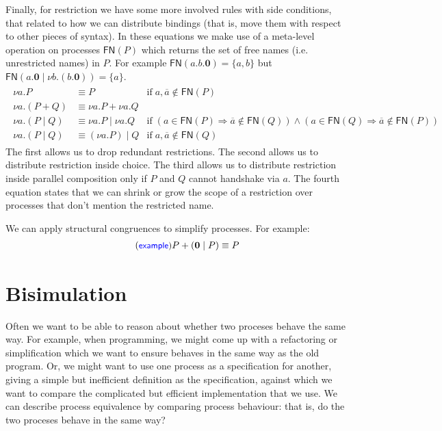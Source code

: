 \documentclass{article}
\newcommand{\exampleLabel}{\tag{\small{\textcolor{blue}{\textsf{example}}}}}
\theoremstyle{definition}
\begin{document}
Finally, for restriction we have some more involved rules
with side conditions, that related to how we can distribute
bindings (that is, move them with respect to other pieces
of syntax). In these equations we make use of a meta-level
operation on processes $\mathsf{FN}(P)$ which returns the
set of free names (i.e. unrestricted names) in $P$.
For example $\mathsf{FN}(a.b.\mathbf{0}) = \{a, b\}$
but $\mathsf{FN}(a.\mathbf{0} \mid \nu b . (b . \mathbf{0})) =
\{a \}$.
%
\begin{align*}
  \begin{array}{rll}
  \nu a . P & \equiv P & \text{if} \; a,
  \overline{a} \not\in \mathsf{FN}(P)  \\
 \nu a . (P + Q) & \equiv \nu a . P + \nu a . Q \\
 \nu a. (P \mid Q) & \equiv \nu a. P \mid \nu a. Q & \text{if}\;(a
  \in \mathsf{FN}(P) \Rightarrow \overline{a} \notin \mathsf{FN}(Q))
 \wedge (a \in \mathsf{FN}(Q) \Rightarrow \overline{a} \not\in
  \mathsf{FN}(P))  \\
\nu a. (P \mid Q) & \equiv (\nu a. P) \mid Q &\text{if}\;a,
                                               \overline{a} \not\in
                                               \mathsf{FN}(Q)
\end{array}
\end{align*}
%
The first allows us to drop redundant restrictions. The second allows
us to distribute restriction inside choice. The third allows us to
distribute restriction inside parallel composition only if
$P$ and $Q$ cannot handshake via $a$. The fourth equation
states that we can shrink or grow the scope of a restriction
over processes that don't mention the restricted name.

We can apply structural congruences to simplify processes. For
example:
%
\begin{align*}
  \exampleLabel{}
  P + (\mathbf{0} \mid P) \equiv P
\end{align*}
%

\section{Bisimulation}

Often we want to be able to reason about whether two proceses behave
the same way. For example, when programming, we might come up with a
refactoring or simplification which we want to ensure behaves in the
same way as the old program. Or, we might want to use one process
as a specification for another, giving a simple but inefficient
definition as the specification, against which we want to compare the
complicated but efficient implementation that we use. We can
describe process equivalence by comparing process behaviour:
that is, do the two proceses behave in the same way?
\end{document}
